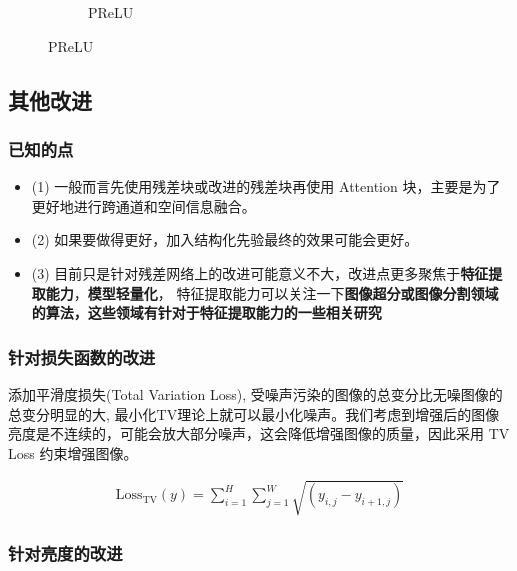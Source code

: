 \documentclass[a4paper]{ctexart}
\begin{document}
\begin{figure}[htbp]
\begin{subfigure}{0.45\textwidth}
				\captionsetup{font=scriptsize}
				\caption{PReLU}
				\label{fig: Baseline_PReLU}	
			\end{subfigure}
		\end{figure}
		
		\subsection{其他改进}
		
		\subsubsection{已知的点}
		
		\begin{itemize}
			\item{(1)}
			一般而言先使用残差块或改进的残差块再使用 Attention 块，主要是为了更好地进行跨通道和空间信息融合。
			
			\item{(2)}
			如果要做得更好，加入结构化先验最终的效果可能会更好。
			
			\item{(3)}
			目前只是针对残差网络上的改进可能意义不大，改进点更多聚焦于\textbf{特征提取能力}，\textbf{模型轻量化}，
			特征提取能力可以关注一下\textbf{图像超分或图像分割领域的算法，这些领域有针对于特征提取能力的一些相关研究}
		\end{itemize}
		
		\subsubsection{针对损失函数的改进}
		
		添加平滑度损失(Total Variation Loss)\cite{rudin1992nonlinear}, 受噪声污染的图像的总变分比无噪图像的总变分明显的大, 最小化TV理论上就可以最小化噪声。我们考虑到增强后的图像亮度是不连续的，可能会放大部分噪声，这会降低增强图像的质量，因此采用 TV Loss 约束增强图像。
		
		\begin{equation}
			\begin{aligned}
				\text{Loss}_{\text{TV}} \left( y \right) = \sum_{i=1}^{H} \sum_{j=1}^{W}\sqrt{\left(y_{i,j} - y_{i+1, j}\right)}			
			\end{aligned}
			\label{eq: TV loss}
		\end{equation}
		
		\FloatBarrier
		
		\subsubsection{针对亮度的改进}
		
\end{document}
